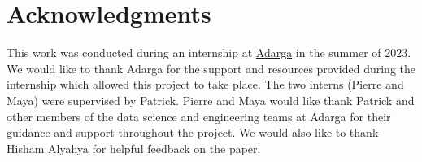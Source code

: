 \section*{Acknowledgments}

This work was conducted during an internship at \href{https://adarga.ai/}{Adarga} in the summer of 2023. We would like to thank Adarga for the support and resources provided during the internship which allowed this project to take place. The two interns (Pierre and Maya) were supervised by Patrick. Pierre and Maya would like thank Patrick and other members of the data science and engineering teams at Adarga for their guidance and support throughout the project. We would also like to thank Hisham Alyahya for helpful feedback on the paper.